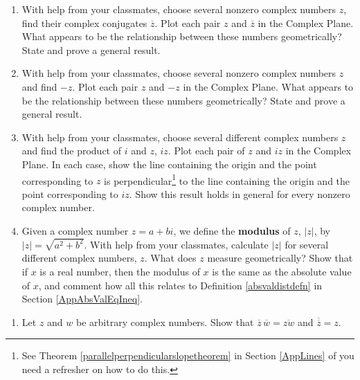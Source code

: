 \documentclass{ximera}
\begin{document}
\begin{enumerate}
\setcounter{enumi}{\value{HW}}

\item  \label{cmpgeoalgexfirst}  With help from your classmates, choose several nonzero complex numbers $z$, find their complex conjugates $\overline{z}$.  Plot each pair $z$ and $\overline{z}$ in the Complex Plane.  What appears to be the relationship between these numbers geometrically?  State and prove a general result.

\item    With help from your classmates, choose several nonzero complex numbers $z$ and  find $-z$.  Plot each pair $z$ and $-z$ in the Complex Plane.  What appears to be the relationship between these numbers geometrically?  State and prove a general result.

\item  With help from your classmates, choose several different complex numbers $z$ and find the product of $i$ and $z$,  $iz$.  Plot each pair of $z$ and $iz$ in the Complex Plane.  In each case, show the line containing the origin and the point corresponding to $z$ is perpendicular\footnote{See Theorem \ref{parallelperpendicularslopetheorem} in Section \ref{AppLines} of you need a refresher on how to do this.} to the line containing the origin and the point corresponding to $iz$.  Show this result holds in general for every nonzero complex number.

\item  \label{cmpgeoalgexlast} Given a complex number $z = a+bi$, we define the \textbf{modulus} of $z$, $|z|$, by $|z| = \sqrt{a^2+b^2}$.  With help from your classmates, calculate $|z|$ for several different complex numbers, $z$.  What does $z$ measure geometrically?  Show that if $x$ is a real number, then the modulus of $x$ is the same as the absolute value of $x$, and comment how all this relates to Definition \ref{absvaldistdefn} in Section \ref{AppAbsValEqIneq}.


\setcounter{HW}{\value{enumi}}
\end{enumerate}


\begin{enumerate}
\setcounter{enumi}{\value{HW}}

\item \label{zbarexercise} Let $z$ and $w$ be arbitrary complex numbers.  Show that  $\overline{z} \, \overline{w}  = \overline{zw}$ and $\overline{\overline{z}} = z$.

\setcounter{HW}{\value{enumi}}
\end{enumerate}
\end{document}
